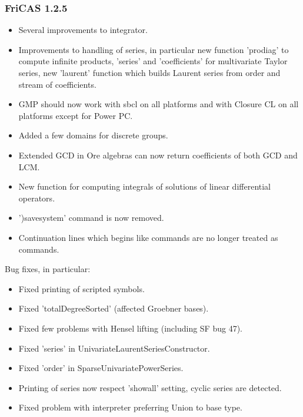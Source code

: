 \subsubsection{FriCAS 1.2.5}
\begin{itemize}

\item Several improvements to integrator.

\item Improvements to handling of series, in particular new
      function 'prodiag' to compute infinite products, 'series' and
      'coefficients' for multivariate Taylor series, new 'laurent'
      function which builds Laurent series from order and stream of
      coefficients.

\item GMP should now work with sbcl on all platforms and with Closure CL
      on all platforms except for Power PC.

\item Added a few domains for discrete groups.

\item Extended GCD in Ore algebras can now return coefficients of
      both GCD and LCM.

\item New function for computing integrals of solutions of linear
      differential operators.

\item ')savesystem' command is now removed.

\item Continuation lines which begins like commands are no longer
      treated as commands.

\end{itemize}

Bug fixes, in particular:

\begin{itemize}

\item Fixed printing of scripted symbols.

\item Fixed 'totalDegreeSorted' (affected Groebner bases).

\item Fixed few problems with Hensel lifting (including SF bug 47).

\item Fixed 'series' in UnivariateLaurentSeriesConstructor.

\item Fixed 'order' in SparseUnivariatePowerSeries.

\item Printing of series now respect 'showall' setting, cyclic
      series are detected.

\item Fixed problem with interpreter preferring Union to base type.

\end{itemize}

